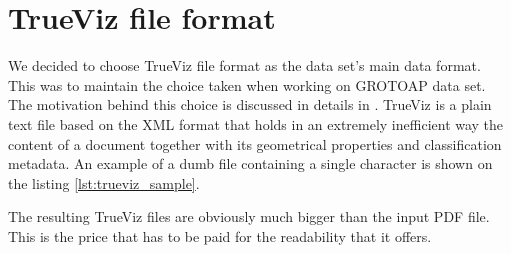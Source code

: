 \section{TrueViz file format}
We decided to choose TrueViz file format as the data set's main data format. This was to maintain the choice taken when working on GROTOAP data set. The motivation behind this choice is discussed in details in \cite{Tkaczyk2012}. TrueViz is a plain text file based on the XML format that holds in an extremely inefficient way the content of a document together with its geometrical properties and classification metadata. An example of a dumb file containing a single character is shown on the listing \ref{lst:trueviz_sample}.

The resulting TrueViz files are obviously much bigger than the input PDF file. This is the price that has to be paid for the readability that it offers.

